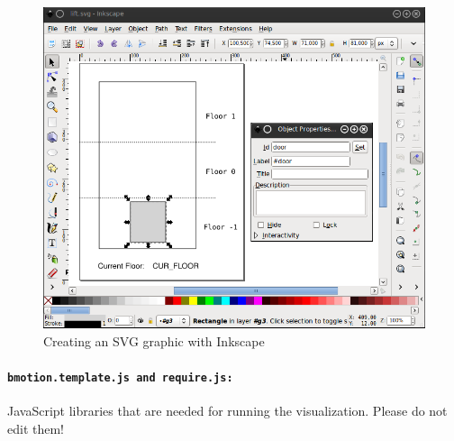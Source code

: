 \begin{figure}[!ht]
\begin{center}
	\includegraphics[width=12cm]{img/tutorial/tut_02.png}
	\caption{Creating an SVG graphic with Inkscape}
	\label{fig_tut_02_inkscape}
\end{center}
\end{figure} 

\paragraph{\texttt{bmotion.template.js and require.js:}}
JavaScript libraries that are needed for running the visualization.
Please do not edit them!

%

